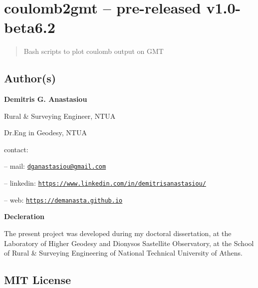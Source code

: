 \section{coulomb2gmt -- pre-released
v1.0-beta6.2}\label{coulomb2gmt-pre-released-v1.0-beta6.2}

\begin{quote}
Bash scripts to plot coulomb output on GMT
\end{quote}
% 

\subsection{Author(s)}\label{authors}

\textbf{Demitris G. Anastasiou}

Rural \& Surveying Engineer, NTUA

Dr.Eng in Geodesy, NTUA

contact:

-- mail: \texttt{\url{dganastasiou@gmail.com}}

-- linkedin: \texttt{\url{https://www.linkedin.com/in/demitrisanastasiou/}}

-- web: \texttt{\url{https://demanasta.github.io}}

\textbf{Decleration}

The present project was developed during my doctoral dissertation, at the Laboratory 
of Higher Geodesy and Dionysos Sastellite Observatory, at the School of Rural \& Surveying
Engineering of National Technical University of Athens.

\subsection{MIT License}

